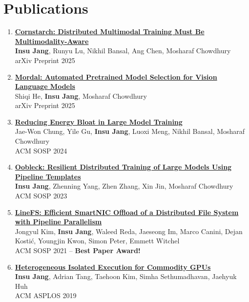 \documentclass[letterpaper,oneside,11pt]{article}
\begin{document}
\section{Publications}
\begin{enumerate}[leftmargin=*]
  \item \small \href{https://arxiv.org/abs/2503.11367}{\textbf{Cornstarch: Distributed Multimodal Training Must Be Multimodality-Aware}} \\
  \textbf{Insu Jang}, Runyu Lu, Nikhil Bansal, Ang Chen, Mosharaf Chowdhury \\
  arXiv Preprint 2025
  \item \small \href{https://arxiv.org/abs/2502.00241}{\textbf{Mordal: Automated Pretrained Model Selection for Vision Language Models}} \\
  Shiqi He, \textbf{Insu Jang}, Mosharaf Chowdhury \\
  arXiv Preprint 2025
  \item \small \href{https://dl.acm.org/doi/abs/10.1145/3694715.3695970}{\textbf{Reducing Energy Bloat in Large Model Training}} \\
  Jae-Won Chung, Yile Gu, \textbf{Insu Jang}, Luoxi Meng, Nikhil Bansal, Mosharaf Chowdhury \\
  ACM SOSP 2024
  \item \small \href{https://dl.acm.org/doi/abs/10.1145/3600006.3613152}{\textbf{Oobleck: Resilient Distributed Training of Large Models Using Pipeline Templates}} \\
  \textbf{Insu Jang}, Zhenning Yang, Zhen Zhang, Xin Jin, Mosharaf Chowdhury \\
  ACM SOSP 2023
  \item \small \href{https://dl.acm.org/doi/abs/10.1145/3477132.3483565}{\textbf{LineFS: Efficient SmartNIC Offload of a Distributed File System with Pipeline Parallelism}} \\
  Jongyul Kim, \textbf{Insu Jang}, Waleed Reda, Jaeseong Im, Marco Canini, Dejan Kostić, Youngjin Kwon, Simon Peter, Emmett Witchel \\
  ACM SOSP 2021 -- \textbf{Best Paper Award!}
  \item \small \href{https://dl.acm.org/doi/abs/10.1145/3297858.3304021}{\textbf{Heterogeneous Isolated Execution for Commodity GPUs}} \\
  \textbf{Insu Jang}, Adrian Tang, Taehoon Kim, Simha Sethumadhavan, Jaehyuk Huh \\
  ACM ASPLOS 2019
\end{enumerate}
\end{document}
